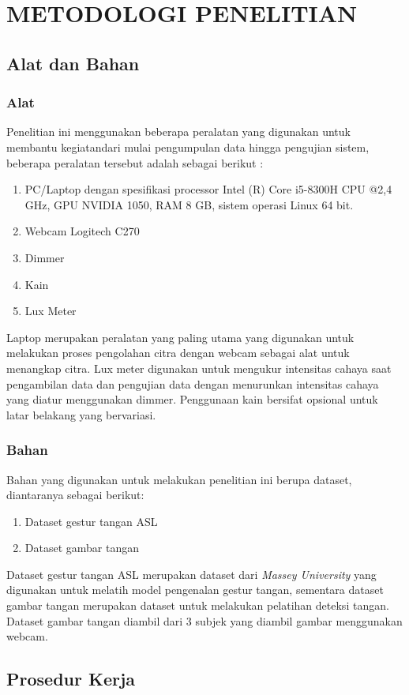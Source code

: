 \chapter{METODOLOGI PENELITIAN}
\section{Alat dan Bahan}
\subsection{Alat}
Penelitian ini menggunakan beberapa peralatan yang digunakan untuk membantu kegiatandari mulai pengumpulan data hingga pengujian sistem, beberapa peralatan tersebut adalah sebagai berikut :
\begin{enumerate}
\item PC/Laptop dengan spesifikasi processor Intel (R) Core i5-8300H CPU @2,4 GHz, GPU NVIDIA 1050, RAM 8 GB, sistem operasi Linux 64 bit.
\item Webcam Logitech C270
\item Dimmer
\item Kain	
\item Lux Meter
\end{enumerate}
Laptop merupakan peralatan yang paling utama yang digunakan untuk melakukan proses pengolahan citra dengan webcam sebagai alat untuk menangkap citra. Lux meter digunakan untuk mengukur intensitas cahaya saat pengambilan data dan pengujian data dengan menurunkan intensitas cahaya yang diatur menggunakan dimmer. Penggunaan kain bersifat opsional untuk latar belakang yang bervariasi.
\subsection{Bahan}
Bahan yang digunakan untuk melakukan penelitian ini berupa dataset, diantaranya sebagai berikut:
\begin{enumerate}
	\item Dataset gestur tangan ASL 
	\item Dataset gambar tangan
\end{enumerate}
Dataset gestur tangan ASL merupakan dataset dari \emph{Massey University} yang digunakan untuk melatih model pengenalan gestur tangan, sementara dataset gambar tangan merupakan dataset untuk melakukan pelatihan deteksi tangan. Dataset gambar tangan diambil dari 3 subjek yang diambil gambar menggunakan webcam.
\section{Prosedur Kerja}
